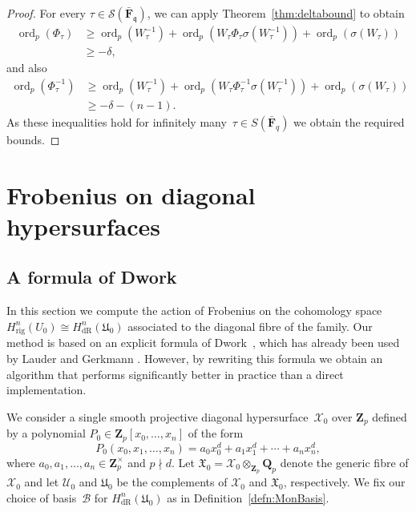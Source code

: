 \documentclass[a4paper,11pt]{article}
\numberwithin{equation}{section}
\newcommand{\ZZ}{\mathbf{Z}} %
\newcommand{\QQ}{\mathbf{Q}} %
\newcommand{\FF}{\mathbf{F}} %
\DeclareMathOperator{\ord}{ord}          %
\providecommand{\HdR}{H_{\text{dR}}}    %
\providecommand{\Hrig}{H_{\text{rig}}}  %
\providecommand{\cB}{\mathcal{B}} %
\theoremstyle{definition}
\begin{document}
\begin{proof}
For every $\tau \in \mathcal{S}(\bar{\FF}_{\mathfrak{q}})$, 
we can apply Theorem~\ref{thm:deltabound} 
to obtain
\begin{align*}
\ord_p(\Phi_{\tau}) &\geq \ord_p(W^{-1}_{\tau}) + 
                          \ord_p(W_{\tau} \Phi_{\tau} \sigma(W_{\tau}^{-1})) + 
                          \ord_p(\sigma(W_{\tau})) \\
                    &\geq -\delta,
\end{align*}
and also
\begin{align*}
\ord_p(\Phi^{-1}_{\tau}) &\geq \ord_p(W^{-1}_{\tau}) + 
                               \ord_p(W_{\tau} \Phi^{-1}_{\tau} \sigma(W_{\tau}^{-1})) + 
                               \ord_p(\sigma(W_{\tau})) \\
                         &\geq -\delta - (n-1).
\end{align*}
As these inequalities hold for infinitely many~$\tau \in S(\bar{\FF}_q)$ 
we obtain the required bounds.
\end{proof}


\section{Frobenius on diagonal hypersurfaces}
\label{sec:Diagonal}

\subsection{A formula of Dwork}

In this section we compute the action of Frobenius on the cohomology 
space $\Hrig^{n}(U_0) \cong \HdR^{n}(\mathfrak{U}_0)$ associated 
to the diagonal fibre of the family. Our method is based on an 
explicit formula of Dwork~\citep[\S 4]{Dwork1964}, which has already 
been used by Lauder \citep{Lauder2004b} and Gerkmann 
\citep{Gerkmann2007}. However, by rewriting this formula we obtain an 
algorithm that performs significantly better in practice than a direct 
implementation.

We consider a single smooth 
projective diagonal hypersurface~$\mathcal{X}_0$ over $\ZZ_p$ defined by 
a polynomial $P_0 \in \ZZ_p[x_0, \dotsc, x_n]$ of the form
\begin{equation*}
P_0(x_0, x_1, \dotsc, x_n) = 
    a_0 x_0^d + a_1 x_1^d + \dotsb + a_n x_n^d,
\end{equation*}
where $a_0, a_1, \dotsc, a_n \in \ZZ_p^{\times}$ and $p \nmid d$. 
Let $\mathfrak{X}_0 = \mathcal{X}_0 \otimes_{\ZZ_p} \QQ_p$ denote the generic 
fibre of $\mathcal{X}_0$ and let $\mathcal{U}_0$ and $\mathfrak{U}_0$ be the 
complements of $\mathcal{X}_0$ and $\mathfrak{X}_0$, respectively. 
We fix our choice of basis~$\cB$ for $\HdR^{n}(\mathfrak{U}_0)$ 
as in Definition~\ref{defn:MonBasis}. 
\end{document}
